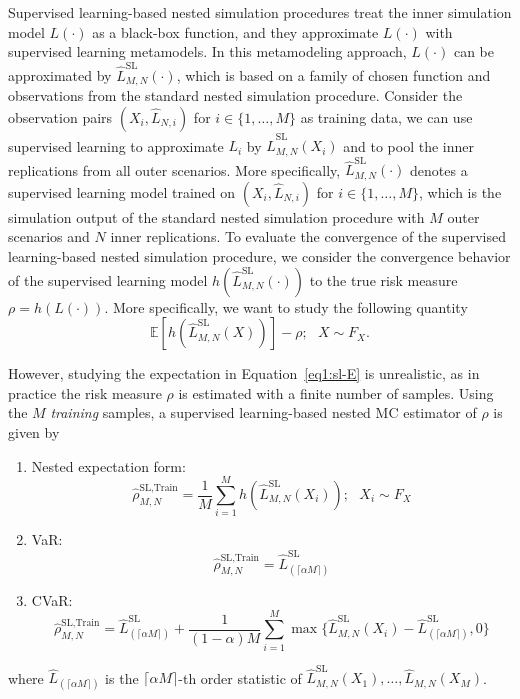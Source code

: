 Supervised learning-based nested simulation procedures treat the inner simulation model $L(\cdot)$ as a black-box function, and they approximate $L(\cdot)$ with supervised learning metamodels.
In this metamodeling approach, $L(\cdot)$ can be approximated by $\hat{L}^{\text{SL}}_{M, N}(\cdot)$, which is based on a family of chosen function and observations from the standard nested simulation procedure.
Consider the observation pairs $(X_i, \hat{L}_{N, i})$ for $i \in \{1, \dots, M\}$ as training data, we can use supervised learning to approximate $L_i$ by $\hat{L}_{M, N}^{\text{SL}}(X_i)$ and to pool the inner replications from all outer scenarios.
More specifically, $\hat{L}^{\text{SL}}_{M, N}(\cdot)$ denotes a supervised learning model trained on $(X_i, \hat{L}_{N, i})$ for $i \in \{1, \dots, M\}$, which is the simulation output of the standard nested simulation procedure with $M$ outer scenarios and $N$ inner replications. 
To evaluate the convergence of the supervised learning-based nested simulation procedure, we consider the convergence behavior of the supervised learning model $h(\hat{L}^{\text{SL}}_{M, N}(\cdot))$ to the true risk measure $\rho = h(L(\cdot))$.
More specifically, we want to study the following quantity
\begin{equation} \label{eq1:sl-E}
    \mathbb{E} \left[ h(\hat{L}^{\text{SL}}_{M, N}(X))   \right] - \rho; ~~~ X \sim F_X.
\end{equation}

However, studying the expectation in Equation~\ref{eq1:sl-E} is unrealistic, as in practice the risk measure $\rho$ is estimated with a finite number of samples.
Using the $M$ \textit{training} samples, a supervised learning-based nested MC estimator of $\rho$ is given by

\begin{enumerate}
    \item   Nested expectation form:
            \begin{equation} \label{eq1:sl-train}
                \hat{\rho}^{\text{SL}, \text{Train}}_{M, N} = \frac{1}{M} \sum_{i=1}^M h(\hat{L}^{\text{SL}}_{M, N}(X_i)); ~~~ X_i \sim F_X
            \end{equation}
    \item   VaR:
            $$\hat{\rho}^{\text{SL}, \text{Train}}_{M, N} = \hat{L}^{\text{SL}}_{(\lceil \alpha M \rceil)}$$
    \item   CVaR:
            $$\hat{\rho}^{\text{SL}, \text{Train}}_{M, N} = \hat{L}^{\text{SL}}_{(\lceil \alpha M \rceil)} + \frac{1}{(1-\alpha) M} \sum_{i=1}^M \max \{\hat{L}^{\text{SL}}_{M, N}(X_i) - \hat{L}^{\text{SL}}_{(\lceil \alpha M \rceil)}, 0 \}$$
\end{enumerate}
where $\hat{L}_{(\lceil \alpha M \rceil)}$ is the $\lceil \alpha M \rceil$-th order statistic of $\hat{L}^{\text{SL}}_{M, N}(X_1), \dots, \hat{L}_{M, N}(X_M)$.

